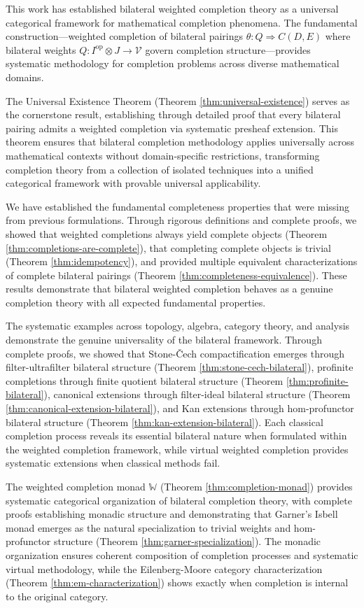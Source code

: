 \documentclass[11pt]{article}
\theoremstyle{plain}
\theoremstyle{definition}
\theoremstyle{remark}
\newcommand{\V}{\mathcal{V}}
\newcommand{\op}{\mathrm{op}}
\begin{document}
This work has established bilateral weighted completion theory as a universal categorical framework for mathematical completion phenomena. The fundamental construction—weighted completion of bilateral pairings $\theta : Q \Rightarrow C(D,E)$ where bilateral weights $Q : I^{\op} \otimes J \to \V$ govern completion structure—provides systematic methodology for completion problems across diverse mathematical domains.

The Universal Existence Theorem (Theorem \ref{thm:universal-existence}) serves as the cornerstone result, establishing through detailed proof that every bilateral pairing admits a weighted completion via systematic presheaf extension. This theorem ensures that bilateral completion methodology applies universally across mathematical contexts without domain-specific restrictions, transforming completion theory from a collection of isolated techniques into a unified categorical framework with provable universal applicability.

We have established the fundamental completeness properties that were missing from previous formulations. Through rigorous definitions and complete proofs, we showed that weighted completions always yield complete objects (Theorem \ref{thm:completions-are-complete}), that completing complete objects is trivial (Theorem \ref{thm:idempotency}), and provided multiple equivalent characterizations of complete bilateral pairings (Theorem \ref{thm:completeness-equivalence}). These results demonstrate that bilateral weighted completion behaves as a genuine completion theory with all expected fundamental properties.

The systematic examples across topology, algebra, category theory, and analysis demonstrate the genuine universality of the bilateral framework. Through complete proofs, we showed that Stone-\v{C}ech compactification emerges through filter-ultrafilter bilateral structure (Theorem \ref{thm:stone-cech-bilateral}), profinite completions through finite quotient bilateral structure (Theorem \ref{thm:profinite-bilateral}), canonical extensions through filter-ideal bilateral structure (Theorem \ref{thm:canonical-extension-bilateral}), and Kan extensions through hom-profunctor bilateral structure (Theorem \ref{thm:kan-extension-bilateral}). Each classical completion process reveals its essential bilateral nature when formulated within the weighted completion framework, while virtual weighted completion provides systematic extensions when classical methods fail.

The weighted completion monad $\mathbb{W}$ (Theorem \ref{thm:completion-monad}) provides systematic categorical organization of bilateral completion theory, with complete proofs establishing monadic structure and demonstrating that Garner's Isbell monad emerges as the natural specialization to trivial weights and hom-profunctor structure (Theorem \ref{thm:garner-specialization}). The monadic organization ensures coherent composition of completion processes and systematic virtual methodology, while the Eilenberg-Moore category characterization (Theorem \ref{thm:em-characterization}) shows exactly when completion is internal to the original category.
\end{document}
